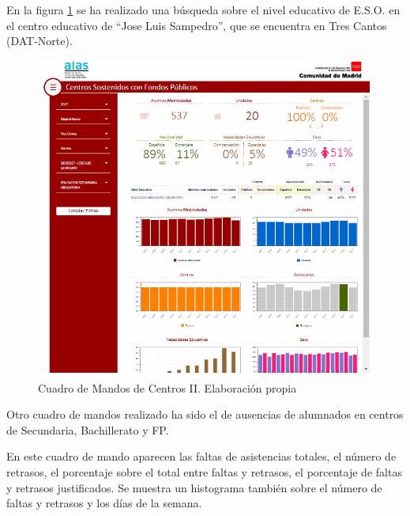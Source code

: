 \begin{subappendices}
En la figura \ref{fig:UnidadesDistintasPrediccion} se ha realizado una búsqueda sobre el nivel educativo de E.S.O. en el centro educativo de ``Jose Luis Sampedro'', que se encuentra en Tres Cantos (DAT-Norte).
\begin{figure}[htb]
	\centering
	\caption{Cuadro de Mandos de Centros II. Elaboración propia}
	\label{fig:UnidadesDistintasPrediccion}
	\includegraphics[width=1\textwidth]{recursos/CentrosResumenII}
\end{figure}
\FloatBarrier

Otro cuadro de mandos realizado ha sido el de ausencias de alumnados en centros de Secundaria, Bachillerato y FP.

En este cuadro de mando aparecen las faltas de asistencias totales, el número de retrasos, el porcentaje sobre el total entre faltas y retrasos, el porcentaje de faltas y retrasos justificados. Se muestra un histograma también sobre el número de faltas y retrasos y los días de la semana.


\end{subappendices}
